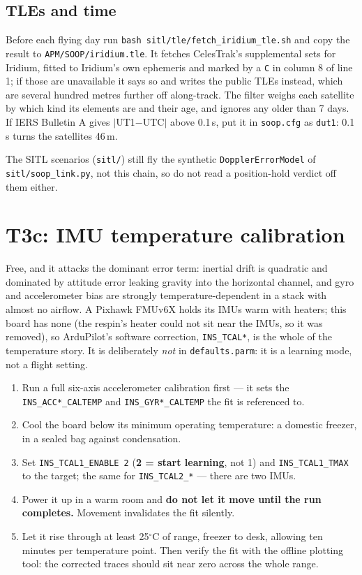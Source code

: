 \documentclass[11pt,a4paper]{article}
\newcommand{\file}[1]{\texttt{\small #1}}
\newcommand{\cmd}[1]{\texttt{\small #1}}
\newcommand{\degC}{$^\circ$C}
\begin{document}
\subsection{TLEs and time}

Before each flying day run \cmd{bash sitl/tle/fetch\_iridium\_tle.sh} and copy the result to
\file{APM/SOOP/iridium.tle}. It fetches CelesTrak's supplemental sets for Iridium, fitted to
Iridium's own ephemeris and marked by a \file{C} in column 8 of line 1; if those are
unavailable it says so and writes the public TLEs instead, which are several hundred metres
further off along-track. The filter weighs each satellite by which kind its elements are and
their age, and ignores any older than 7 days. If IERS Bulletin A gives $|$UT1$-$UTC$|$ above 0.1\,s, put it
in \file{soop.cfg} as \file{dut1}: 0.1\,s turns the satellites 46\,m.

The SITL scenarios (\file{sitl/}) still fly the synthetic \file{DopplerErrorModel} of
\file{sitl/soop\_link.py}, not this chain, so do not read a position-hold verdict off them
either.

\section{T3c: IMU temperature calibration}

Free, and it attacks the dominant error term: inertial drift is quadratic and dominated by
attitude error leaking gravity into the horizontal channel, and gyro and accelerometer bias
are strongly temperature-dependent in a stack with almost no airflow. A Pixhawk FMUv6X holds
its IMUs warm with heaters; this board has none (the respin's heater could not sit near the
IMUs, so it was removed), so ArduPilot's software correction, \file{INS\_TCAL*}, is the
whole of the temperature story. It is deliberately \emph{not} in \file{defaults.parm}: it is a
learning mode, not a flight setting.

\begin{enumerate}
\item Run a full six-axis accelerometer calibration first --- it sets the
\file{INS\_ACC*\_CALTEMP} and \file{INS\_GYR*\_CALTEMP} the fit is referenced to.
\item Cool the board below its minimum operating temperature: a domestic freezer, in a
sealed bag against condensation.
\item Set \file{INS\_TCAL1\_ENABLE 2} (\textbf{2 = start learning}, not 1) and
\file{INS\_TCAL1\_TMAX} to the target; the same for \file{INS\_TCAL2\_*} --- there are two IMUs.
\item Power it up in a warm room and \textbf{do not let it move until the run completes.}
Movement invalidates the fit silently.
\item Let it rise through at least 25\degC{} of range, freezer to desk, allowing ten minutes
per temperature point. Then verify the fit with the offline plotting tool: the corrected
traces should sit near zero across the whole range.
\end{enumerate}
\end{document}
